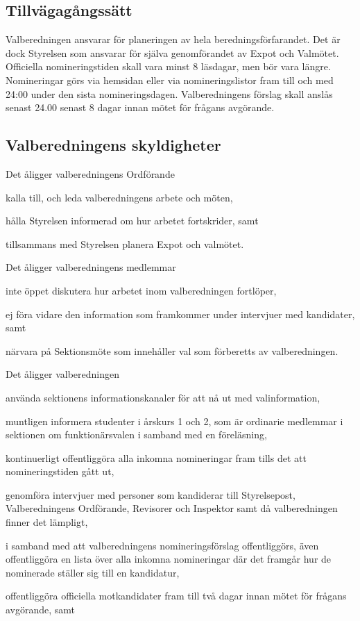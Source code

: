 \documentclass[10pt]{article}
\begin{document}
\subsection{Tillvägagångssätt}

Valberedningen ansvarar för planeringen av hela beredningsförfarandet.
Det är dock Styrelsen som ansvarar för själva genomförandet av Expot och
Valmötet. Officiella nomineringstiden skall vara minst 8 läsdagar, men
bör vara längre. Nomineringar görs via hemsidan eller via nomineringslistor fram till och med 24:00 under den sista nomineringsdagen. Valberedningens förslag skall
anslås senast 24.00 senast 8 dagar innan mötet för frågans avgörande.

\subsection{Valberedningens skyldigheter}

Det åligger valberedningens Ordförande
\begin{attlist}
    \item kalla till, och leda valberedningens arbete och möten,
    \item hålla Styrelsen informerad om hur arbetet fortskrider, samt
    \item tillsammans med Styrelsen planera Expot och valmötet.
\end{attlist}
Det åligger valberedningens medlemmar
\begin{attlist}
    \item inte öppet diskutera hur arbetet inom valberedningen fortlöper,
    \item ej föra vidare den information som framkommer under intervjuer
        med kandidater, samt
    \item närvara på Sektionsmöte som innehåller val som förberetts av
        valberedningen.
\end{attlist}
Det åligger valberedningen
\begin{attlist}
    \item använda sektionens informationskanaler för att nå ut med valinformation,
    \item muntligen informera studenter i årskurs 1 och 2, som är ordinarie medlemmar i sektionen om funktionärsvalen i samband med
        en föreläsning,
    \item kontinuerligt offentliggöra alla inkomna nomineringar fram tills
        det att nomineringstiden gått ut,
    \item genomföra intervjuer med personer som kandiderar till Styrelsepost,
        Valberedningens Ordförande, Revisorer och
        Inspektor samt då valberedningen finner det lämpligt,
    \item i samband med att valberedningens nomineringsförslag offentliggörs,
        även offentliggöra en lista över alla inkomna nomineringar där det
        framgår hur de nominerade ställer sig till en kandidatur,
    \item offentliggöra officiella motkandidater fram till två dagar innan
        mötet för frågans avgörande, samt
\end{attlist}
\end{document}
